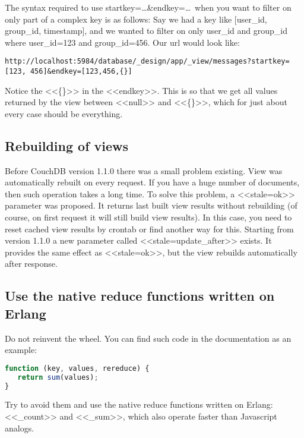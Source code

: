 The syntax required to use startkey=\dots\&endkey=\dots~when you want to filter on only part of a complex key is as follows:
Say we had a key like [user\_id, group\_id, timestamp], and we wanted to filter on only user\_id and group\_id where user\_id=123 and group\_id=456. Our url would look like:

\begin{lstlisting}[label=lst:couchdb1,caption=Filtering Views by Parts of a Complex Key]
http://localhost:5984/database/_design/app/_view/messages?startkey=[123, 456]&endkey=[123,456,{}]
\end{lstlisting}

Notice the <<\{\}>> in the <<endkey>>. This is so that we get all values returned by the view between <<null>> and <<\{\}>>, which for just about every case should be everything.

\subsection{Rebuilding of views}

Before CouchDB version 1.1.0 there was a small problem existing. View was automatically rebuilt on every request. If you have a huge number of documents, then such operation takes a long time. To solve this problem, a <<stale=ok>> parameter was proposed. It returns last built view results without rebuilding (of course, on first request it will still build view results). In this case, you need to reset cached view results by crontab or find another way for this. Starting from version 1.1.0 a new parameter called <<stale=update\_after>> exists. It provides the same effect as <<stale=ok>>, but the view rebuilds automatically after response.

\subsection{Use the native reduce functions written on Erlang}

Do not reinvent the wheel. You can find such code in the documentation as an example:

\begin{lstlisting}[language=Javascript,label=lst:couchdb2,caption=Use the native reduce functions written on Erlang]
function (key, values, rereduce) {
   return sum(values);
}
\end{lstlisting}

Try to avoid them and use the native reduce functions written on Erlang: <<\_count>> and <<\_sum>>, which also operate faster than Javascript analogs.

